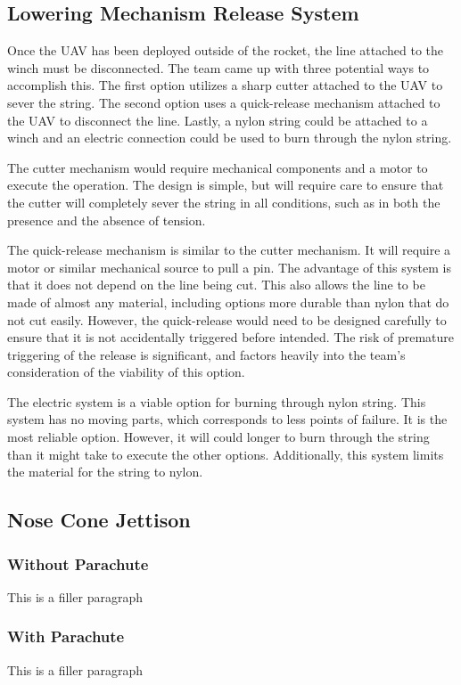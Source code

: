 	\subsection{Lowering Mechanism Release System}
		Once the UAV has been deployed outside of the rocket, the line attached to the winch must be disconnected. The team came up with three potential ways to accomplish this. The first option utilizes a sharp cutter attached to the UAV to sever the string. The second option uses a quick-release mechanism attached to the UAV to disconnect the line. Lastly, a nylon string could be attached to a winch and an electric connection could be used to burn through the nylon string. 

		The cutter mechanism would require mechanical components and a motor to execute the operation. The design is simple, but will require care to ensure that the cutter will completely sever the string in all conditions, such as in both the presence and the absence of tension. 
	
		The quick-release mechanism is similar to the cutter mechanism. It will require a motor or similar mechanical source to pull a pin. The advantage of this system is that it does not depend on the line being cut. This also allows the line to be made of almost any material, including options more durable than nylon that do not cut easily. However, the quick-release would need to be designed carefully to ensure that it is not accidentally triggered before intended. The risk of premature triggering of the release is significant, and factors heavily into the team’s consideration of the viability of this option. 
	
		The electric system is a viable option for burning through nylon string. This system has no moving parts, which corresponds to less points of failure. It is the most reliable option. However, it will could longer to burn through the string than it might take to execute the other options. Additionally, this system limits the material for the string to nylon. 
	

	\subsection{Nose Cone Jettison}
		\subsubsection{Without Parachute}
			This is a filler paragraph
		
		\subsubsection{With Parachute}
			This is a filler paragraph

